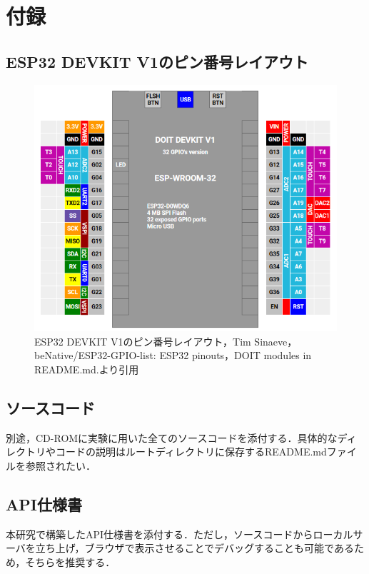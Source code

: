 \section{付録}
  \label{付録}
    \subsection{ESP32 DEVKIT V1のピン番号レイアウト}
      \label{sec:ESP32 DEVKIT V1のピン番号レイアウト}
        \begin{figure}[htbp]
          \centering
          \includegraphics[scale=1]
          {figures/DOIT-DEVKIT-V1-32.png}
          \caption{ESP32 DEVKIT V1のピン番号レイアウト，Tim Sinaeve，beNative/ESP32-GPIO-list: ESP32 pinouts，DOIT modules in README.md.\cite{esppingithub}より引用}
          \label{fig:ピン番号レイアウト}
        \end{figure}
  
       \subsection{ソースコード}
        \label{sec:ソースコード}
         \par 別途，CD-ROMに実験に用いた全てのソースコードを添付する．具体的なディレクトリやコードの説明はルートディレクトリに保存するREADME.mdファイルを参照されたい．

       \subsection{API仕様書}
        \label{sec:API仕様書}
         \par 本研究で構築したAPI仕様書を添付する．ただし，ソースコードからローカルサーバを立ち上げ，ブラウザで表示させることでデバッグすることも可能であるため，そちらを推奨する．
    
